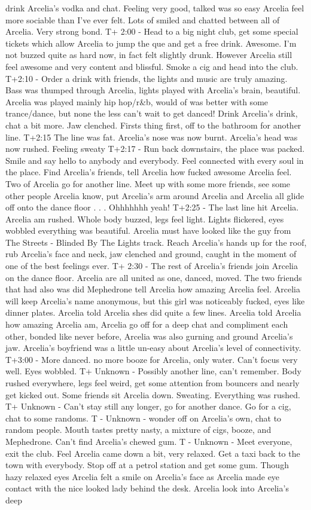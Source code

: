 \documentclass[12pt]{book}
\begin{document}
drink Arcelia's vodka and chat. Feeling very good, talked was so easy Arcelia feel more sociable than I've ever felt. Lots of smiled and chatted between all of Arcelia. Very strong bond. T+ 2:00 - Head to a big night club, get some special tickets which allow Arcelia to jump the que and get a free drink. Awesome. I'm not buzzed quite as hard now, in fact felt slightly drunk. However Arcelia still feel awesome and very content and blissful. Smoke a cig and head into the club. T+2:10 - Order a drink with friends, the lights and music are truly amazing. Bass was thumped through Arcelia, lights played with Arcelia's brain, beautiful. Arcelia was played mainly hip hop/r\&b, would of was better with some trance/dance, but none the less can't wait to get danced! Drink Arcelia's drink, chat a bit more. Jaw clenched. Firsts thing first, off to the bathroom for another line. T+2:15 The line was fat. Arcelia's nose was now burnt. Arcelia's head was now rushed. Feeling sweaty T+2:17 - Run back downstairs, the place was packed. Smile and say hello to anybody and everybody. Feel connected with every soul in the place. Find Arcelia's friends, tell Arcelia how fucked awesome Arcelia feel. Two of Arcelia go for another line. Meet up with some more friends, see some other people Arcelia know, put Arcelia's arm around Arcelia and Arcelia all glide off onto the dance floor . . .  Ohhhhhhh yeah! T+2:25 - The last line hit Arcelia. Arcelia am rushed. Whole body buzzed, legs feel light. Lights flickered, eyes wobbled everything was beautiful. Arcelia must have looked like the guy from The Streets - Blinded By The Lights track. Reach Arcelia's hands up for the roof, rub Arcelia's face and neck, jaw clenched and ground, caught in the moment of one of the best feelings ever. T+ 2:30 - The rest of Arcelia's friends join Arcelia on the dance floor. Arcelia are all united as one, danced, moved. The two friends that had also was did Mephedrone tell Arcelia how amazing Arcelia feel. Arcelia will keep Arcelia's name anonymous, but this girl was noticeably fucked, eyes like dinner plates. Arcelia told Arcelia shes did quite a few lines. Arcelia told Arcelia how amazing Arcelia am, Arcelia go off for a deep chat and compliment each other, bonded like never before, Arcelia was also gurning and ground Arcelia's jaw. Arcelia's boyfriend was a little un-easy about Arcelia's level of connectivity. T+3:00 - More danced. no more booze for Arcelia, only water. Can't focus very well. Eyes wobbled. T+ Unknown - Possibly another line, can't remember. Body rushed everywhere, legs feel weird, get some attention from bouncers and nearly get kicked out. Some friends sit Arcelia down. Sweating. Everything was rushed. T+ Unknown - Can't stay still any longer, go for another dance. Go for a cig, chat to some randoms. T - Unknown - wonder off on Arcelia's own, chat to random people. Mouth tastes pretty nasty, a mixture of cigs, booze, and Mephedrone. Can't find Arcelia's chewed gum. T - Unknown - Meet everyone, exit the club. Feel Arcelia came down a bit, very relaxed. Get a taxi back to the town with everybody. Stop off at a petrol station and get some gum. Though hazy relaxed eyes Arcelia felt a smile on Arcelia's face as Arcelia made eye contact with the nice looked lady behind the desk. Arcelia look into Arcelia's deep 
\end{document}
